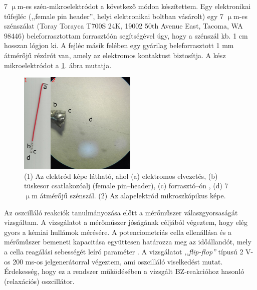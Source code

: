 7 $\upmu$m-es szén-mikroelektródot a következő módon készítettem. Egy elektronikai tűfejléc (,,female pin header'', helyi elektronikai boltban vásárolt) egy 7 $\upmu$m-es szénszálat (Toray Torayca T700S 24K, 19002 50th Avenue East, Tacoma, WA 98446) beleforrasztottam forrasztóón segítségével úgy, hogy a szénszál kb. 1 cm hosszan lógjon ki. A fejléc másik felében egy gyárilag beleforrasztott 1 mm átmérőjű rézdrót van, amely az elektromos kontaktust biztosítja. A kész mikroelektródot a \ref{fig:szen7}. ábra mutatja.
\begin{figure}
\centering
\includegraphics[width=0.5\textwidth]{img/szenmikro.png}
\caption{(1) Az elektród képe látható, ahol (a) elektromos elvezetés, (b) tüskesor csatlakozóalj (female pin--header), (c) forrasztó--ón , (d) 7 $\upmu$m átmérőjű szénszál. (2) Az alapelektród mikroszkópikus képe.}
\label{fig:szen7}
\end{figure}

Az oszcilláló reakciók tanulmányozása előtt a mérőműszer válaszgyorsaságát vizsgáltam. A vizsgálatot a mérőműszer jóságának céljából végeztem, hogy elég gyors a kémiai hullámok mérésére. A potenciometriás cella ellenállása és a mérőműszer bemeneti kapacitása együttesen határozza meg az időállandót, mely a cella reagálási sebességét leíró paraméter \cite{kiss2015deconvolution}. A vizsgálatot \emph{,,flip-flop''} típusú 2 V-os 200 ms-os jelgenerátorral végeztem, ami oszcilláló viselkedést mutat. Érdekesség, hogy ez a rendszer működésében a vizsgált BZ-reakcióhoz hasonló (relaxációs) oszcillátor.

